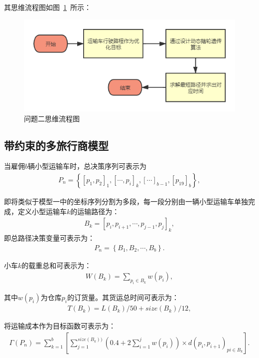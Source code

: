 \documentclass{whutmod}
\begin{document}
    其思维流程图如图~\ref{lssssct}~所示：

\begin{figure}[H]
	\centering
	\includegraphics[width=\textwidth]{figures/abab.png}
	\caption{问题二思维流程图}\label{lssssct}
\end{figure}

\subsection{带约束的多旅行商模型}
当雇佣$b$辆小型运输车时，总决策序列可表示为
\begin{gather*}
P_n=\left \{[p_{1},p_{2}]_1,[\cdots,p_{i}]_k,[\cdots]_{b-1},[p_{19}]_b\right \},
\end{gather*}

即将类似于模型一中的坐标序列分割为多段，每一段分别由一辆小型运输车单独完成，定义小型运输车$k$的运输路径为：
\begin{gather*}
B_k=[p_{i},p_{i+1},\cdots,p_{j-1},p_{j}]_k,
\end{gather*}
即总路径决策变量可表示为：
\begin{gather*}
P_n=\left \{B_1,B_2,\cdots,B_b\right \}.
\end{gather*}

小车$k$的载重总和可表示为：
\begin{gather}
W (B_k)=\sum_{p_i\in B_k}w(p_{i}),
\end{gather}

其中$w(p_{i})$为仓库$p_{i}$的订货量。其货运总时间可表示为：
\begin{gather}
T (B_k)=L(B_k)/50+size(B_k)/12,
\end{gather}

将运输成本作为目标函数可表示为：
\begin{gather*}
\Gamma (P_n)=\sum _{k=1}^b[\sum _{j=1}^{size(B_k))}(0.4+2\sum _{i=1}^jw(p_i))\times d(p_i,p_{i+1})_{pi\in B_k}].
\end{gather*}
\end{document}
